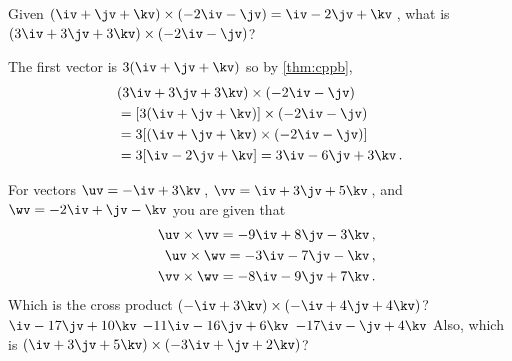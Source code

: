 \begin{example} \label{eg:}
Given \((\iv+\jv+\kv)\times(-2\iv-\jv)=\iv-2\jv+\kv\)\,, what is \((3\iv+3\jv+3\kv)\times(-2\iv-\jv)\)?
\begin{solution} 
The first vector is \(3(\iv+\jv+\kv)\) so by \autoref{thm:cppb},
\begin{align*}
&(3\iv+3\jv+3\kv)\times(-2\iv-\jv)
\\&=[3(\iv+\jv+\kv)]\times(-2\iv-\jv)
\\&=3[(\iv+\jv+\kv)\times(-2\iv-\jv)]
\\&=3[\iv-2\jv+\kv]=3\iv-6\jv+3\kv\,.
\end{align*}
\end{solution}
\end{example}



\begin{activity} \label{ex:} 
For vectors \(\uv=-\iv+3\kv\)\,, \(\vv=\iv+3\jv+5\kv\)\,, and \(\wv=-2\iv+\jv-\kv\) you are given that 
\begin{eqnarray*}
&&\uv\times\vv=-9\iv+8\jv-3\kv\,,
\\&&\uv\times\wv=-3\iv-7\jv-\kv\,,
\\&&\vv\times\wv=-8\iv-9\jv+7\kv\,.
\end{eqnarray*}
Which is the cross product \((-\iv+3\kv)\times(-\iv+4\jv+4\kv)\)?
\actposs{\(-12\iv+\jv-4\kv\)}
{\(\iv-17\jv+10\kv\)}
{\(-11\iv-16\jv+6\kv\)}
{\(-17\iv-\jv+4\kv\)}
Also, which is \((\iv+3\jv+5\kv)\times(-3\iv+\jv+2\kv)\)? %
\end{activity}



